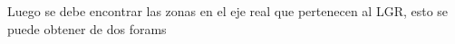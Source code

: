 \documentclass[
  11pt,
  letterpaper,
   addpoints,
   answers
  ]{exam}
\begin{document}
\begin{questions}
\begin{solution}

Luego se debe encontrar las zonas en el eje real que pertenecen al LGR, esto se puede obtener de dos forams
\end{solution}

\end{questions}
\newpage
\end{document}
